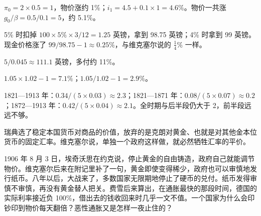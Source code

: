 \begin{answers}
\item $\pi_0=2\times0.5=1$，物价涨约 1\%；$i_1=4.5+0.1\times1=4.6\%$。物价一共涨 $g_0/\beta=0.5/0.1=5$，约 5.1\%。
\item 5\% 时扣掉 $100\times5\%\times3/12=1.25$ 英镑，拿到 98.75 英镑；4\% 时拿到 99 英镑。现金价格涨了 $99/98.75-1\approx0.25\%$，与维克塞尔说的 $\tfrac14\%$ 一样。
\item $5/0.045\approx111.1$ 英镑，多付约 11\%。
\item $1.05\times1.02-1=7.1\%$；$1.05/1.02-1=2.9\%$。
\item 1821—1913 年：$0.34/(5\times0.03)\approx2.3$；1821—1871 年：$0.08/(5\times0.07)\approx0.2$；1872—1913 年：$0.42/(5\times0.04)\approx2.1$。全时期与后半段仍大于 2，前半段远远不够。
\item 瑞典选了稳定本国货币对商品的价值，放弃的是克朗对黄金、也就是对其他金本位货币的固定汇率。维克塞尔说，单独一个政府这样做，就必然牺牲汇率的平价。
\end{answers}

1906 年 8 月 3 日，埃奇沃思在约克说，停止黄金的自由铸造，政府自己就能调节物价\cite{wicksell1907}。维克塞尔后来在附记里补了一句，黄金即使变得稀少，政府也可以审慎地发行纸币\cite{wicksell1907}。八年以后，大战来了，多数国家无限期地停止了硬币的兑付\cite{barsky1985}。纸币发得审慎不审慎，再没有黄金替人把关。费雪后来算出，在通胀最快的那段时间，德国的实际利率接近负 100\%，借出去的钱收回来时几乎一文不值\cite{fisher1930}。一个国家为什么会印钞印到物价每天翻倍？恶性通胀又是怎样一夜止住的？
